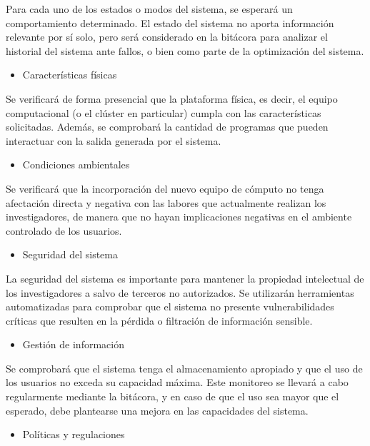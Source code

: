 \documentclass{scrreprt}
\begin{document}
Para cada uno de los estados o modos del sistema, se esperará un comportamiento determinado. El estado del sistema no aporta información relevante por sí solo, pero será considerado en la bitácora para analizar el historial del sistema ante fallos, o bien como parte de la optimización del sistema.

\begin{itemize}
\item Características físicas
\end{itemize}

Se verificará de forma presencial que la plataforma física, es decir, el equipo computacional (o el clúster en particular) cumpla con las características solicitadas. Además, se comprobará la cantidad de programas que pueden interactuar con la salida generada por el sistema.

\begin{itemize}
\item Condiciones ambientales
\end{itemize}

Se verificará que la incorporación del nuevo equipo de cómputo no tenga afectación directa y negativa con las labores que actualmente realizan los investigadores, de manera que no hayan implicaciones negativas en el ambiente controlado de los usuarios.

\begin{itemize}
\item Seguridad del sistema
\end{itemize}

La seguridad del sistema es importante para mantener la propiedad intelectual de los investigadores a salvo de terceros no autorizados. Se utilizarán herramientas automatizadas para comprobar que el sistema no presente vulnerabilidades críticas que resulten en la pérdida o filtración de información sensible.

\begin{itemize}
\item Gestión de información
\end{itemize}

Se comprobará que el sistema tenga el almacenamiento apropiado y que el uso de los usuarios no exceda su capacidad máxima. Este monitoreo se llevará a cabo regularmente mediante la bitácora, y en caso de que el uso sea mayor que el esperado, debe plantearse una mejora en las capacidades del sistema.

\begin{itemize}
\item Políticas y regulaciones
\end{itemize}
\end{document}

